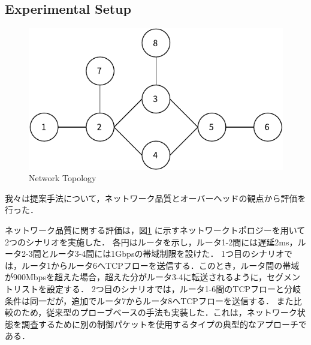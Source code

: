 \documentclass[conference]{IEEEtran}
\begin{document}
\subsection{Experimental Setup}

\begin{figure}[t]
  \centering
  \includegraphics[width=0.7\linewidth]{./figures/topo.pdf}
  \caption{Network Topology}
  \label{fig:network-topology}
\end{figure}


我々は提案手法について，ネットワーク品質とオーバーヘッドの観点から評価を行った．

ネットワーク品質に関する評価は，図\ref{fig:network-topology} に示すネットワークトポロジーを用いて2つのシナリオを実施した．
各円はルータを示し，ルータ1-2間には遅延2ms，ルータ2-3間とルータ3-4間には1Gbpsの帯域制限を設けた．
1つ目のシナリオでは，ルータ1からルータ6へTCPフローを送信する．このとき，ルータ間の帯域が900Mbpsを超えた場合，超えた分がルータ3-4に転送されるように，セグメントリストを設定する．
2つ目のシナリオでは，ルータ1-6間のTCPフローと分岐条件は同一だが，追加でルータ7からルータ8へTCPフローを送信する．
また比較のため，従来型のプローブベースの手法も実装した．これは，ネットワーク状態を調査するために別の制御パケットを使用するタイプの典型的なアプローチである．
\end{document}
